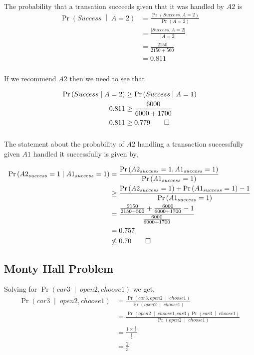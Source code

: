 \documentclass[letterpaper,10pt]{article} %
\newcommand{\pipe}{\;\middle\vert\;}
\newcommand{\condp}[2]{\Pr\left( #1 \pipe #2 \right)}
\newcommand{\pr}[1]{\Pr\left( #1 \right)}
\newcommand{\condpe}[2]{\frac{\pr{#1,#2}}{\pr{#2}}}
\newcommand{\norm}[1]{\left|#1\right|}
\newcommand{\prove}[1]{
\begin{Proof}
\begin{align*}
#1
\end{align*}
\end{Proof}
}
\begin{document}
\subsubsection{}
The probability that a transation succeeds given that it was handled by $A2$ is
\begin{align*}
\condp{Success}{A=2} &= \condpe{Success}{A=2}\\
&= \frac{\norm{Success, A=2}}{\norm{A=2}}\\
&= \frac{2150}{2150+500}\\
&= 0.811
\end{align*}

\subsubsection{}
If we recommend $A2$ then we need to see that
\prove{
\condp{Success}{A=2} &\geq \condp{Success}{A=1}\\
0.811 &\geq \frac{6000}{6000+1700}\\
0.811 &\geq 0.779 \qedhere
}

\subsubsection{}
The statement about the probability of $A2$ handling a transaction successfully given $A1$ handled it successfully is given by,
\prove{
\condp{A2_{success}=1}{A1_{success}=1} &= \condpe{A2_{success}=1}{A1_{success}=1}\\
&\geq \frac{\pr{A2_{success}=1}+\pr{A1_{success}=1}-1}{\pr{A1_{success}=1}}\\
&= \frac{\frac{2150}{2150+500}+\frac{6000}{6000+1700}-1}{\frac{6000}{6000+1700}}\\
&= 0.757 \\
&\not\leq 0.70 \qedhere
}

\subsection{Monty Hall Problem}

Solving for $\pr{car3 \pipe open2, choose1}$ we get,
\begin{align*}
 \pr{car3 \pipe open2, choose1} &= \frac{\condp{car3, open2}{choose1}}{\condp{open2}{choose1}}\\
 &=\frac{\condp{open2}{choose1,car3}\condp{car3}{choose1}}{\condp{open2}{choose1}} \\
 &=\frac{1 \times \tfrac{1}{3}}{\tfrac{1}{2}} \\
 &=\tfrac{2}{3}
\end{align*}
\end{document}
